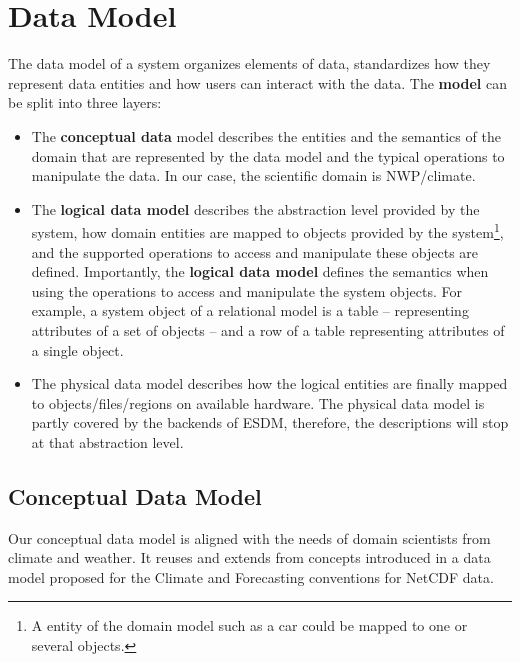 \section{Data Model}%
\label{data-model}

The data model of a system organizes elements of data, standardizes how they represent data entities and how users can interact with the data.
The \textbf{model} can be split into three layers:

\begin{itemize}
  \item The \textbf{conceptual data} model describes the entities and the semantics of the domain that are represented by the data model and the typical operations to manipulate the data. 
    In our case, the scientific domain is NWP/climate.
  \item The \textbf{logical data model} describes the abstraction level provided by the system, how domain entities are mapped to objects provided by the system\footnote{A entity of the domain model such as a car could be mapped to one or several objects.}, and the supported operations to access and manipulate these objects are defined.
    Importantly, the \textbf{logical data model} defines the semantics when using the operations to access and manipulate the system objects.
    For example, a system object of a relational model is a table -- representing attributes of a set of objects -- and a row of a table representing attributes of a single object.
  \item The physical data model describes how the logical entities are finally mapped to objects/files/regions on available hardware. 
    The physical data model is partly covered by the backends of ESDM, therefore, the descriptions will stop at that abstraction level.
\end{itemize}

\subsection{Conceptual Data Model}

Our conceptual data model is aligned with the needs of domain scientists from climate and weather. 
It reuses and extends from concepts introduced in a data model proposed for the Climate and Forecasting conventions for NetCDF data.


